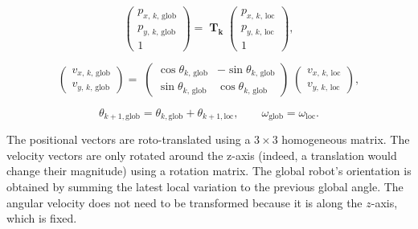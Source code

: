 $$
\begin{pmatrix} p_{x,\,k,\,\text{glob} } \\ p_{y,\,k,\,\text{glob}} \\ 1 \end{pmatrix} = \; \mathbf{T_k} \;
\begin{pmatrix}
p_{x,\,k,\,\text{loc} } \\ p_{y,\,k,\,\text{loc}} \\ 1
\end{pmatrix},
$$

$$
\begin{pmatrix} v_{x,\,k,\,\text{glob} } \\ v_{y,\,k,\,\text{glob}}\end{pmatrix} = \; \begin{pmatrix} \cos\theta_{k,\, \text{glob}} & -\sin\theta_{k,\, \text{glob}} \\ \sin\theta_{k,\, \text{glob}} & \cos\theta_{k,\, \text{glob}} \end{pmatrix}\;
\begin{pmatrix}
v_{x,\,k,\,\text{loc} } \\ v_{y,\,k,\,\text{loc}}
\end{pmatrix},
$$

$$ 
\theta_{k+1, \text{glob}} = \theta_{k, \text{glob}} + \theta_{k+1, \text{loc}},
\qquad
\omega_{\text{glob}} = \omega_{\text{loc}}.
$$

The positional vectors are roto-translated using a $3\times3$ homogeneous matrix. The velocity vectors are only rotated around the z-axis (indeed, a translation would change their magnitude) using a rotation matrix. The global robot's orientation is obtained by summing the latest local variation to the previous global angle. The angular velocity does not need to be transformed because it is along the $z$-axis, which is fixed.

